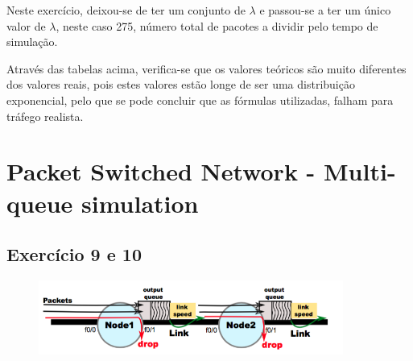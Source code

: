 \documentclass[pdftex,12pt,a4paper]{report}
\begin{document}
\begin{table}[!htb]
\centering
{}
\caption{Valores teóricos e simulados do atraso e da probabilidade de perda de pacotes no Node 2}
\end{table}

Neste exercício, deixou-se de ter um conjunto de $\lambda$ e passou-se a ter um único valor de $\lambda$, neste caso 275, número total de pacotes a dividir pelo tempo de simulação.

Através das tabelas acima, verifica-se que os valores teóricos são muito diferentes dos valores reais, pois estes valores estão longe de ser uma distribuição exponencial, pelo que se pode concluir que as fórmulas utilizadas, falham para tráfego realista. 

\newpage
\section{Packet Switched Network - Multi-queue simulation}

\subsection{Exercício 9 e 10}

\begin{figure}[!htb]
\center
 \includegraphics[width=100mm,scale=1]{imagensGuia/ex9.png}
 \label{fig:ex9}
\end{figure}
\end{document}
